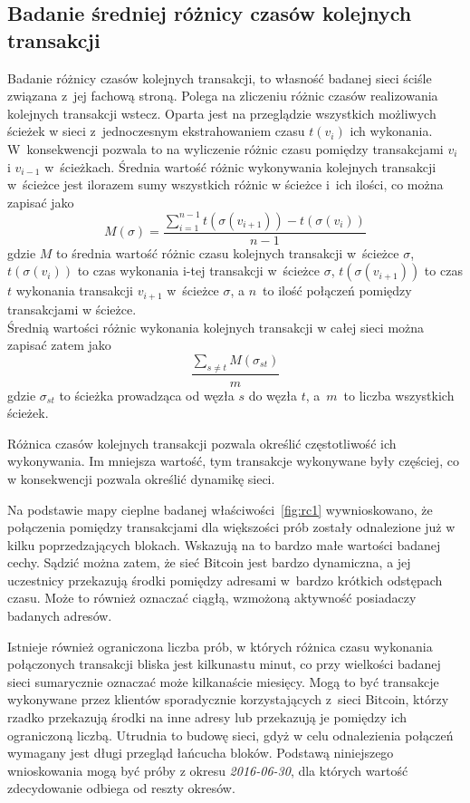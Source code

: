 \documentclass[12pt, oneside, final, openany]{mgr}
\begin{document}
\subsection{Badanie średniej różnicy czasów kolejnych transakcji}
\label{roznice_czasow}
\indent Badanie różnicy czasów kolejnych transakcji, to własność badanej sieci ściśle związana z~jej fachową stroną. Polega na zliczeniu różnic czasów realizowania kolejnych transakcji wstecz. Oparta jest na przeglądzie wszystkich możliwych ścieżek w sieci z~jednoczesnym ekstrahowaniem czasu $t(v_i)$ ich wykonania. W~konsekwencji pozwala to na wyliczenie różnic czasu pomiędzy transakcjami $v_i$ i $v_{i-1}$ w~ścieżkach. Średnia wartość różnic wykonywania kolejnych transakcji w~ścieżce jest ilorazem sumy wszystkich różnic w ścieżce i~ich ilości, co można zapisać jako
\begin{equation}
\label{eq:rckt1}
M(\sigma) = \frac{\sum_{i=1}^{n-1} t(\sigma(v_{i+1})) - t(\sigma(v_{i}))}{n-1}
\end{equation}
gdzie $M$ to średnia wartość różnic czasu kolejnych transakcji w~ścieżce $\sigma$, $t(\sigma(v_i))$ to czas wykonania i-tej transakcji w~ścieżce $\sigma$, $t(\sigma(v_{i+1}))$ to czas $t$ wykonania transakcji $v_{i+1}$ w~ścieżce $\sigma$, a $n$~to ilość połączeń pomiędzy transakcjami w ścieżce. 
\\ Średnią wartości różnic wykonania kolejnych transakcji w całej sieci można zapisać zatem jako
\begin{equation}
\label{eq:rckt2}
\frac{\sum_{s \ne t}^{} M(\sigma_{st})}{m}
\end{equation}
gdzie $\sigma_{st}$ to ścieżka prowadząca od węzła $s$ do węzła $t$, a~$m$~to liczba wszystkich ścieżek.

\indent Różnica czasów kolejnych transakcji pozwala określić 
częstotliwość ich wykonywania. Im mniejsza wartość, tym transakcje wykonywane były częściej, co w konsekwencji pozwala określić dynamikę sieci.

\indent Na podstawie mapy cieplne badanej właściwości~\ref{fig:rc1} wywnioskowano, że połączenia pomiędzy transakcjami dla większości prób zostały odnalezione już w kilku poprzedzających blokach. Wskazują na to bardzo małe wartości badanej cechy. Sądzić można zatem, że sieć Bitcoin jest bardzo dynamiczna, a jej uczestnicy przekazują środki pomiędzy adresami w~bardzo krótkich odstępach czasu. Może to również oznaczać ciągłą, wzmożoną aktywność posiadaczy badanych adresów.

\indent Istnieje również ograniczona liczba prób, w których różnica czasu wykonania połączonych transakcji bliska jest kilkunastu minut, co przy wielkości badanej sieci sumarycznie oznaczać może kilkanaście miesięcy. Mogą to być transakcje wykonywane przez klientów sporadycznie korzystających z~sieci Bitcoin, którzy rzadko przekazują środki na inne adresy lub przekazują je pomiędzy ich ograniczoną liczbą. Utrudnia to budowę sieci, gdyż w celu odnalezienia połączeń wymagany jest długi przegląd łańcucha bloków. Podstawą niniejszego wnioskowania mogą być próby z okresu \textit{2016-06-30}, dla których wartość zdecydowanie odbiega od reszty okresów. 
\end{document}
